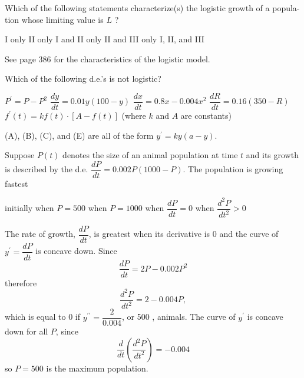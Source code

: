 \question
Which of the following statements characterize(s) the logistic growth of a popula- tion whose limiting value is $L$ ?

\begin{choices}
  \choice I only
  \choice II only
  \choice I and II only
  \choice II and III only
  \CorrectChoice I, II, and III
\end{choices}
\begin{solution}
See page 386 for the characteristics of the logistic model.
\end{solution}




\newpage



\question
Which of the following d.e.'s is not logistic?
\begin{choices}
  \choice $P^{\prime}=P-P^{2}$
  \choice $\dfrac{d y}{d t}=0.01 y(100-y)$
  \choice $\dfrac{d x}{d t}=0.8 x-0.004 x^{2}$
  \CorrectChoice $\dfrac{d R}{d t}=0.16(350-R)$
  \choice $f^{\prime}(t)=k f(t) \cdot[A-f(t)]$ (where $k$ and $A$ are constants)
\end{choices}
\begin{solution}
(A), (B), (C), and (E) are all of the form $y^{\prime}=k y(a-y)$.
\end{solution}

\question
Suppose $P(t)$ denotes the size of an animal population at time $t$ and its growth is described by the d.e. $\dfrac{d P}{d t}=0.002 P(1000-P)$. The population is growing fastest
\begin{choices}
  \choice initially
  \CorrectChoice when $P=500$
  \choice when $P=1000$
  \choice when $\dfrac{d P}{d t}=0$
  \choice when $\dfrac{d^{2} P}{d t^{2}}>0$
\end{choices}
\begin{solution}
The rate of growth, $\dfrac{d P}{d t}$, is greatest when its derivative is 0 and the curve of $y^{\prime}=\dfrac{d P}{d t}$ is concave down. Since
\[
\dfrac{d P}{d t}=2 P-0.002 P^{2}
\]
therefore
\[
\dfrac{d^{2} P}{d t^{2}}=2-0.004 P,
\]
which is equal to 0 if $y^{\prime \prime}=\dfrac{2}{0.004}$, or 500 , animals. The curve of $y^{\prime}$ is concave down for all $P$, since
\[
\dfrac{d}{d t}\left(\dfrac{d^{2} P}{d t^{2}}\right)=-0.004
\]
so $P=500$ is the maximum population.
\end{solution}




